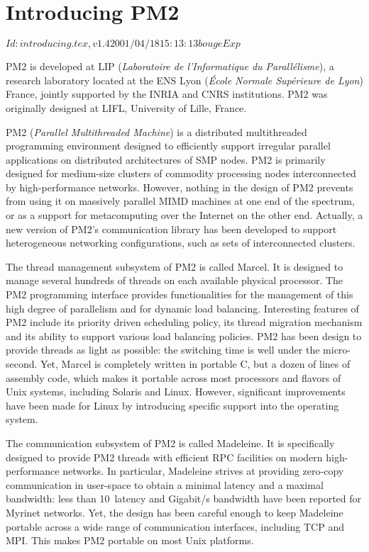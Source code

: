 \chapter{Introducing PM2}

\stamp $Id: introducing.tex,v 1.4 2001/04/18 15:13:13 bouge Exp $

PM2 is developed at LIP (\emph{Laboratoire de l'Informatique du
  Parall\'elisme}), a research laboratory located at the ENS Lyon
(\emph{\'Ecole Normale Sup\'erieure de Lyon}) France, jointly
supported by the INRIA and CNRS institutions. PM2 was originally
designed at LIFL, University of Lille, France.
  
PM2 (\emph{Parallel Multithreaded Machine}) is a distributed
multithreaded programming environment designed to efficiently support
irregular parallel applications on distributed architectures of SMP
nodes. PM2 is primarily designed for medium-size clusters of commodity
processing nodes interconnected by high-performance networks. However,
nothing in the design of PM2 prevents from using it on massively
parallel MIMD machines at one end of the spectrum, or as a support for
metacomputing over the Internet on the other end. Actually, a new
version of PM2's communication library has been developed to support
heterogeneous networking configurations, such as sets of
interconnected clusters.

The thread management subsystem of PM2 is called Marcel. It is
designed to manage several hundreds of threads on each available
physical processor. The PM2 programming interface provides
functionalities for the management of this high degree of parallelism
and for dynamic load balancing. Interesting features of PM2 include
its priority driven scheduling policy, its thread migration mechanism
and its ability to support various load balancing policies. PM2 has
been design to provide threads as light as possible: the switching
time is well under the micro-second. Yet, Marcel is completely written
in portable C, but a dozen of lines of assembly code, which makes it
portable across most processors and flavors of Unix systems, including
Solaris and Linux. However, significant improvements have been made
for Linux by introducing specific support into the operating system.

The communication subsystem of PM2 is called Madeleine. It is
specifically designed to provide PM2 threads with efficient RPC
facilities on modern high-performance networks. In particular,
Madeleine strives at providing zero-copy communication in user-space
to obtain a minimal latency and a maximal bandwidth: less than
10~\us latency and Gigabit/s bandwidth have been reported for
Myrinet networks.  Yet, the design has been careful enough to keep
Madeleine portable across a wide range of communication interfaces,
including TCP and MPI. This makes PM2 portable on most Unix
platforms.


